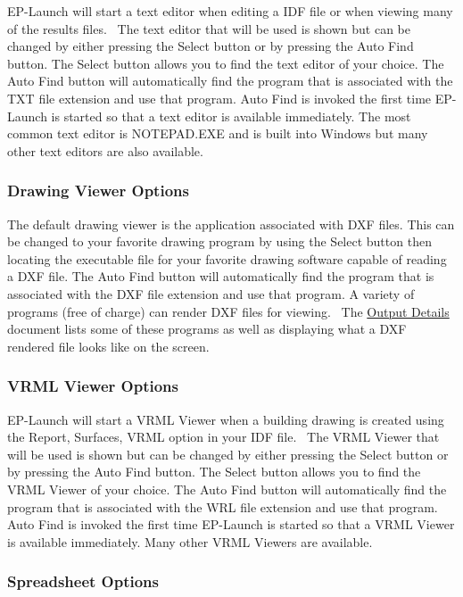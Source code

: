 EP-Launch will start a text editor when editing a IDF file or when viewing many of the results files.~ The text editor that will be used is shown but can be changed by either pressing the Select button or by pressing the Auto Find button. The Select button allows you to find the text editor of your choice. The Auto Find button will automatically find the program that is associated with the TXT file extension and use that program. Auto Find is invoked the first time EP-Launch is started so that a text editor is available immediately. The most common text editor is NOTEPAD.EXE and is built into Windows but many other text editors are also available.

\subsubsection{Drawing Viewer Options}\label{drawing-viewer-options}

The default drawing viewer is the application associated with DXF files. This can be changed to your favorite drawing program by using the Select button then locating the executable file for your favorite drawing software capable of reading a DXF file. The Auto Find button will automatically find the program that is associated with the DXF file extension and use that program. A variety of programs (free of charge) can render DXF files for viewing.~ The \href{file:///E:/Docs4PDFs/OutputDetailsAndExamples.pdf}{Output Details} document lists some of these programs as well as displaying what a DXF rendered file looks like on the screen.

\subsubsection{VRML Viewer Options}\label{vrml-viewer-options}

EP-Launch will start a VRML Viewer when a building drawing is created using the Report, Surfaces, VRML option in your IDF file.~ The VRML Viewer that will be used is shown but can be changed by either pressing the Select button or by pressing the Auto Find button. The Select button allows you to find the VRML Viewer of your choice. The Auto Find button will automatically find the program that is associated with the WRL file extension and use that program. Auto Find is invoked the first time EP-Launch is started so that a VRML Viewer is available immediately. Many other VRML Viewers are available.

\subsubsection{Spreadsheet Options}\label{spreadsheet-options}

